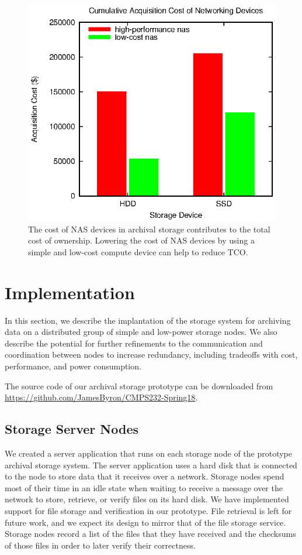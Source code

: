 \begin{figure}[!ht]
\includegraphics[width=\linewidth]{fig2.eps}
\caption{The cost of NAS devices in archival storage contributes to the total cost of ownership.  Lowering the cost of NAS devices by using a simple and low-cost compute device can help to reduce TCO.}
\label{fig2}
\end{figure}

\section{Implementation}
In this section, we describe the implantation of the storage system for archiving data on a distributed group of simple and low-power storage nodes.  We also describe the potential for further refinements to the communication and coordination between nodes to increase redundancy, including tradeoffs with cost, performance, and power consumption.

The source code of our archival storage prototype can be downloaded from \url{https://github.com/JamesByron/CMPS232-Spring18}.

\subsection{Storage Server Nodes}
We created a server application that runs on each storage node of the prototype archival storage system.  The server application uses a hard disk that is connected to the node to store data that it receives over a network.  Storage nodes spend most of their time in an idle state when waiting to receive a message over the network to store, retrieve, or verify files on its hard disk.  We have implemented support for file storage and verification in our prototype.  File retrieval is left for future work, and we expect its design to mirror that of the file storage service.  Storage nodes record a list of the files that they have received and the checksums of those files in order to later verify their correctness.


